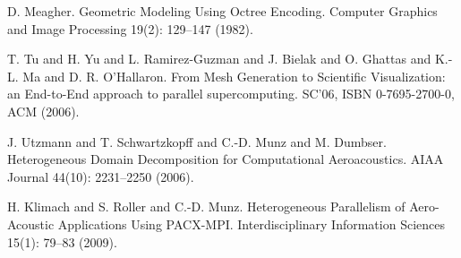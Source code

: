 
\begin{thebibliography}{10}

{\sc D. Meagher}. {Geometric Modeling Using Octree Encoding}. Computer Graphics and Image Processing 19(2): 129--147 (1982).



{\sc T. Tu and H. Yu and L. Ramirez-Guzman and J. Bielak and O. Ghattas and K.-L. Ma and D. R. O'Hallaron}. {From Mesh Generation to Scientific Visualization: an End-to-End approach to parallel supercomputing}. SC'06, ISBN 0-7695-2700-0, ACM (2006).



{\sc J. Utzmann and T. Schwartzkopff and C.-D. Munz and M. Dumbser}. {Heterogeneous Domain Decomposition for Computational Aeroacoustics}. AIAA Journal 44(10): 2231--2250 (2006).



{\sc H. Klimach and S. Roller and C.-D. Munz}. {Heterogeneous Parallelism of Aero-Acoustic Applications Using PACX-MPI}. Interdisciplinary Information Sciences 15(1): 79--83 (2009).

\end{thebibliography}
